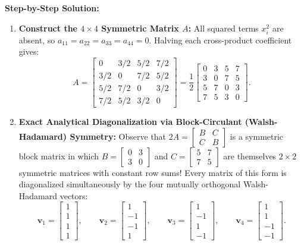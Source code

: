 \documentclass[11pt, letterpaper]{article}
\theoremstyle{definition}
\theoremstyle{remark}
\begin{document}
\textbf{Step-by-Step Solution:}
\begin{enumerate}[leftmargin=2em]
    \item \textbf{Construct the $4 \times 4$ Symmetric Matrix $A$:}
    All squared terms $x_i^2$ are absent, so $a_{11} = a_{22} = a_{33} = a_{44} = 0$. Halving each cross-product coefficient gives:
    \[
    A = \begin{bmatrix}
    0 & 3/2 & 5/2 & 7/2 \\
    3/2 & 0 & 7/2 & 5/2 \\
    5/2 & 7/2 & 0 & 3/2 \\
    7/2 & 5/2 & 3/2 & 0
    \end{bmatrix} = \frac{1}{2}\begin{bmatrix}
    0 & 3 & 5 & 7 \\
    3 & 0 & 7 & 5 \\
    5 & 7 & 0 & 3 \\
    7 & 5 & 3 & 0
    \end{bmatrix}.
    \]
    \item \textbf{Exact Analytical Diagonalization via Block-Circulant (Walsh-Hadamard) Symmetry:}
    Observe that $2A = \begin{bmatrix} B & C \\ C & B \end{bmatrix}$ is a symmetric block matrix in which $B = \begin{bmatrix} 0 & 3 \\ 3 & 0 \end{bmatrix}$ and $C = \begin{bmatrix} 5 & 7 \\ 7 & 5 \end{bmatrix}$ are themselves $2 \times 2$ symmetric matrices with constant row sums! Every matrix of this form is diagonalized simultaneously by the four mutually orthogonal Walsh-Hadamard vectors:
    \[
    \mathbf{v}_1 = \begin{bmatrix} 1 \\ 1 \\ 1 \\ 1 \end{bmatrix}, \qquad \mathbf{v}_2 = \begin{bmatrix} 1 \\ -1 \\ -1 \\ 1 \end{bmatrix}, \qquad \mathbf{v}_3 = \begin{bmatrix} 1 \\ -1 \\ 1 \\ -1 \end{bmatrix}, \qquad \mathbf{v}_4 = \begin{bmatrix} 1 \\ 1 \\ -1 \\ -1 \end{bmatrix}.
\]
\end{enumerate}
\end{document}
